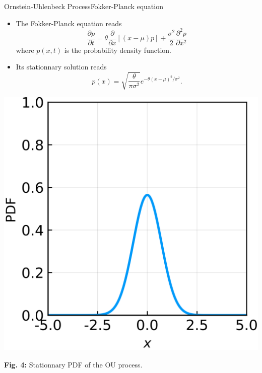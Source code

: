 \documentclass[usenames,dvipsnames,svgnames,10pt,aspectratio=169]{beamer}
\begin{document}
\begin{frame}[t, c]{Ornstein-Uhlenbeck Process}{Fokker-Planck equation}
	\begin{minipage}{.48\textwidth}
		\begin{itemize}
			\item The Fokker-Planck equation reads
			$$
			\frac{\partial p}{\partial t} = \theta \frac{\partial}{\partial x} \left[ \left( x - \mu \right) p \right] + \frac{\sigma^2}{2} \frac{\partial^2 p}{\partial x^2}
			$$
			where $p(x, t)$ is the probability density function.

			\medskip

			\item Its stationnary solution reads
			$$
			p(x) = \sqrt{\frac{\theta}{\pi \sigma^2}} e^{-\theta (x - \mu)^2 / \sigma^2}.
			$$
		\end{itemize}
	\end{minipage}%
	\hfill
	\begin{minipage}{.48\textwidth}
		\centering
		\includegraphics[width=.75\columnwidth]{ornstein_uhlenbeck_process_pdf}

		\small{
			\textbf{Fig. 4:} Stationnary PDF of the OU process.
			}
	\end{minipage}

	\vspace{1cm}
\end{frame}
\end{document}
